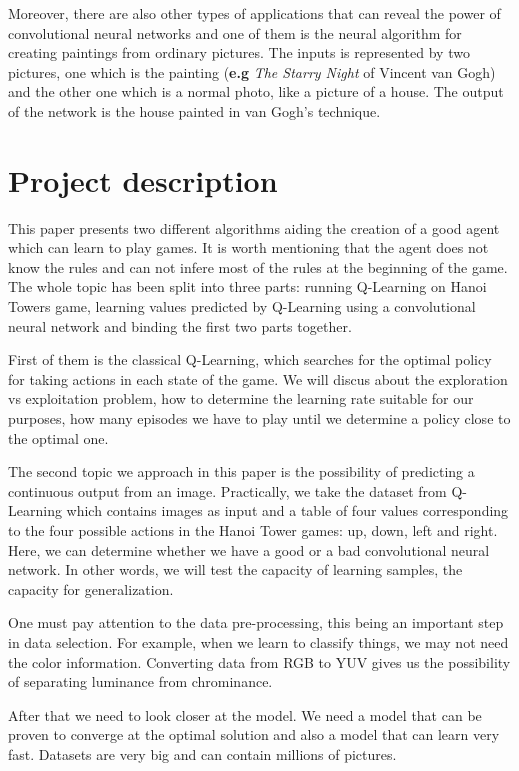 Moreover, there are also other types of applications that can reveal the power of convolutional neural networks and one of them is the neural algorithm for creating paintings\cite{paintings} from ordinary pictures. The inputs is represented by two pictures, one which is the painting (\textbf{e.g} \textit{The Starry Night} of Vincent van Gogh) and the other one which is a normal photo, like a picture of a house. The output of the network is the house painted in van Gogh's technique.


\section{Project description}
\label{sec:proj-description}
This paper presents two different algorithms aiding the creation of a good agent which can learn to play games. It is worth mentioning that the agent does not know the rules and can not infere most of the rules at the beginning of the game. The whole topic has been split into three parts: running Q-Learning on Hanoi Towers game, learning values predicted by Q-Learning using a convolutional neural network and binding the first two parts together.

First of them is the classical Q-Learning, which searches for the optimal policy for taking actions in each state of the game. We will discus about the exploration vs exploitation problem, how to determine the learning rate suitable for our purposes, how many episodes we have to play until we determine a policy close to the optimal one.

The second topic we approach in this paper is the possibility of predicting a continuous output from an image. Practically, we take the dataset from Q-Learning which contains images as input and a table of four values corresponding to the four possible actions in the Hanoi Tower games: up, down, left and right.
Here, we can determine whether we have a good or a bad convolutional neural network. In other words, we will test the capacity of learning samples, the capacity for generalization.

One must pay attention to the data pre-processing, this being an important step in data selection. For example, when we learn to classify things, we may not need the color information. Converting data from RGB to YUV gives us the possibility of separating luminance from chrominance.

After that we need to look closer at the model. We need a model that can be proven to converge at the optimal solution and also a model that can learn very fast. Datasets are very big and can contain millions of pictures.

